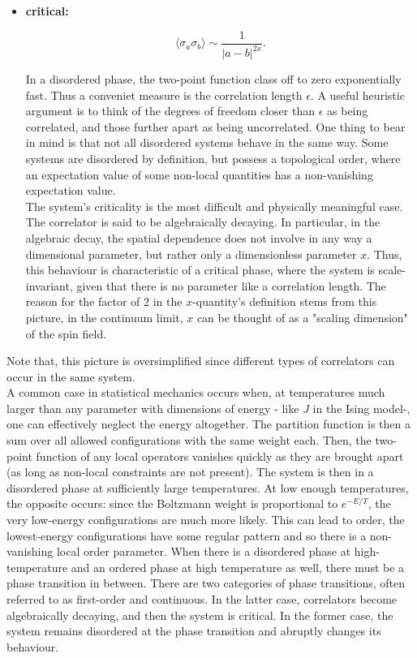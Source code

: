\documentclass{homework}
\begin{document}
\begin{itemize}
    \item \textbf{critical:} 
    
    $$
      \langle \sigma_a \sigma_b \rangle \sim \frac{1}{|a-b|^{2x}}.
    $$
    
    In a disordered phase, the two-point function class off to zero exponentially fast. Thus a conveniet measure is the correlation length $\epsilon$. A useful heuristic argument is to think of the degrees of freedom closer than $\epsilon$ as being correlated, and those further apart as being uncorrelated. One thing to bear in mind is that not all disordered systems behave in the same way. Some systems are disordered by definition, but possess a topological order, where an expectation value of some non-local quantities has a non-vanishing expectation value. \\

The system's criticality is the most difficult and physically meaningful case. The correlator is said to be algebraically decaying. In particular, in the algebraic decay, the spatial dependence does not involve in any way a dimensional parameter, but rather only a dimensionless parameter $x$. Thus, this behaviour is characteristic of a critical phase, where the system is scale-invariant, given that there is no parameter like a correlation length. The reason for the factor of 2 in the $x$-quantity's definition stems from this picture, in the continuum limit, $x$ can be thought of as a "scaling dimension" of the spin field. \\
\end{itemize}

Note that, this picture is oversimplified since different types of correlators can occur in the same system. \\


A common case in statistical mechanics occurs when, at temperatures much larger than any parameter with dimensions of energy - like $J$ in the Ising model-, one can effectively neglect the energy altogether. The partition function is then a sum over all allowed configurations with the same weight each. Then, the two-point function of any local operators vanishes quickly as they are brought apart (as long as non-local constraints are not present). The system is then in a disordered phase at sufficiently large temperatures. At low enough temperatures, the opposite occurs: since the Boltzmann weight is proportional to $e^{-E/T}$, the very low-energy configurations are much more likely. This can lead to order, the lowest-energy configurations have some regular pattern and so there is a non-vanishing local order parameter. When there is a disordered phase at high-temperature and an ordered phase at high temperature as well, there must be a phase transition in between. There are two categories of phase transitions, often referred to as first-order and continuous. In the latter case, correlators become algebraically decaying, and then the system is critical. In the former case, the system remains disordered at the phase transition and abruptly changes its behaviour. \\
\end{document}
